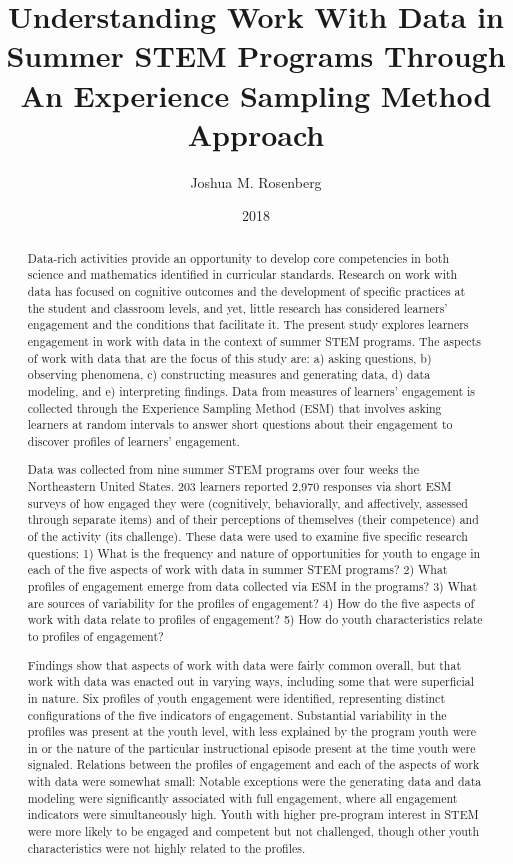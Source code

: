 \documentclass[]{msu-thesis}
\title{Understanding Work With Data in Summer STEM Programs Through An Experience Sampling Method Approach}
\author{Joshua M. Rosenberg}
\date{2018}
\theoremstyle{definition}
\theoremstyle{definition}
\theoremstyle{definition}
\theoremstyle{remark}
\begin{document}

\maketitlepage
\begin{abstract}

Data-rich activities provide an opportunity to develop core competencies in both science and mathematics identified in curricular standards. Research on work with data has focused on cognitive outcomes and the development of specific practices at the student and classroom levels, and yet, little research has considered learners’ engagement and the conditions that facilitate it. The present study explores learners engagement in work with data in the context of summer STEM programs. The aspects of work with data that are the focus of this study are: a) asking questions, b) observing phenomena, c) constructing measures and generating data, d) data modeling, and e) interpreting findings. Data from measures of learners' engagement is collected through the Experience Sampling Method (ESM) that involves asking learners at random intervals to answer short questions about their engagement to discover profiles of learners' engagement.

Data was collected from nine summer STEM programs over four weeks the Northeastern United States. 203 learners reported 2,970 responses via short ESM surveys of how engaged they were (cognitively, behaviorally, and affectively, assessed through separate items) and of their perceptions of themselves (their competence) and of the activity (its challenge).  These data were used to examine five specific research questions: 1) What is the frequency and nature of opportunities for youth to engage in each of the five aspects of work with data in summer STEM programs? 2) What profiles of engagement emerge from data collected via ESM in the programs? 3) What are sources of variability for the profiles of engagement? 4) How do the five aspects of work with data relate to profiles of engagement? 5) How do youth characteristics relate to profiles of engagement?

Findings show that aspects of work with data were fairly common overall, but that work with data was enacted out in varying ways, including some that were superficial in nature. Six profiles of youth engagement were identified, representing distinct configurations of the five indicators of engagement.  Substantial variability in the profiles was present at the youth level, with less explained by the program youth were in or the nature of the particular instructional episode present at the time youth were signaled. Relations between the profiles of engagement and each of the aspects of work with data were somewhat small: Notable exceptions were the generating data and data modeling were significantly associated with full engagement, where all engagement indicators were simultaneously high. Youth with higher pre-program interest in STEM were more likely to be engaged and competent but not challenged, though other youth characteristics were not highly related to the profiles.


\end{abstract}
\end{document}
